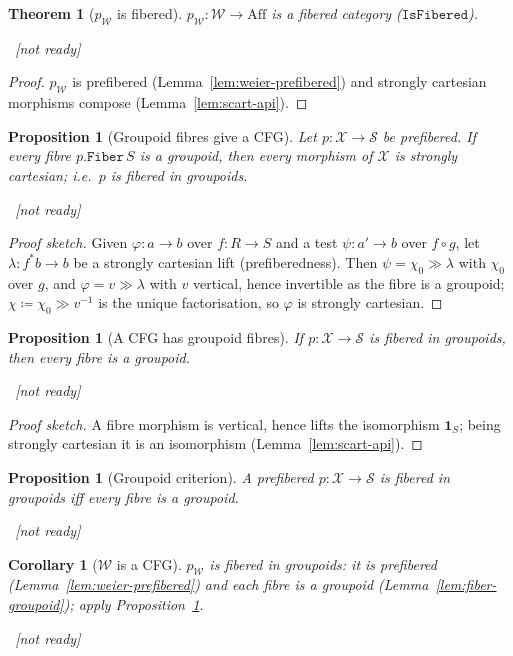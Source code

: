\documentclass[11pt]{article}
\newcommand{\lean}[1]{\par\smallskip\noindent{\footnotesize\texttt{Lean:\ #1}}\par}
\newcommand{\uses}[1]{}
\newcommand{\notready}{{\footnotesize\textcolor{red!60!black}{\ [not ready]}}}
\theoremstyle{definition}
\theoremstyle{plain}
\newtheorem{proposition}[definition]{Proposition}
\newtheorem{theorem}[definition]{Theorem}
\newtheorem{corollary}[definition]{Corollary}
\theoremstyle{remark}
\newcommand{\Aff}{\mathrm{Aff}}
\newcommand{\Weier}{\mathcal{W}}
\newcommand{\isFib}{\mathtt{IsFibered}}
\newcommand{\onel}{\mathbf 1}
\begin{document}
\begin{theorem}[$p_{\Weier}$ is fibered]\label{thm:weier-fibered}
$p_{\Weier}:\Weier\to\Aff$ is a fibered category ($\isFib$).
\lean{}\notready
\uses{def:isfibered,lem:weier-prefibered,lem:scart-api}
\end{theorem}
\begin{proof}
$p_{\Weier}$ is prefibered (Lemma~\ref{lem:weier-prefibered}) and strongly
cartesian morphisms compose (Lemma~\ref{lem:scart-api}).
\end{proof}

\begin{proposition}[Groupoid fibres give a CFG]\label{prop:cfg-suff}
Let $p:\mathcal X\to\mathcal S$ be prefibered.  If every fibre
$p.\mathtt{Fiber}\,S$ is a groupoid, then every morphism of $\mathcal X$ is
strongly cartesian; i.e.\ $p$ is fibered in groupoids.
\lean{}\notready
\uses{def:cfg,def:fiber,def:isfibered}
\end{proposition}
\begin{proof}[Proof sketch]
Given $\varphi:a\to b$ over $f:R\to S$ and a test $\psi:a'\to b$ over $f\circ g$,
let $\lambda:f^*b\to b$ be a strongly cartesian lift (prefiberedness).  Then
$\psi=\chi_0\gg\lambda$ with $\chi_0$ over $g$, and $\varphi=v\gg\lambda$ with $v$
vertical, hence invertible as the fibre is a groupoid; $\chi\coloneqq\chi_0\gg
v^{-1}$ is the unique factorisation, so $\varphi$ is strongly cartesian.
\end{proof}

\begin{proposition}[A CFG has groupoid fibres]\label{prop:cfg-nec}
If $p:\mathcal X\to\mathcal S$ is fibered in groupoids, then every fibre is a
groupoid.
\lean{}\notready
\uses{def:cfg,def:fiber,lem:scart-api}
\end{proposition}
\begin{proof}[Proof sketch]
A fibre morphism is vertical, hence lifts the isomorphism $\onel_S$; being
strongly cartesian it is an isomorphism (Lemma~\ref{lem:scart-api}).
\end{proof}

\begin{proposition}[Groupoid criterion]\label{prop:cfg-criterion}
A prefibered $p:\mathcal X\to\mathcal S$ is fibered in groupoids iff every fibre
is a groupoid.
\lean{}\notready
\uses{prop:cfg-suff,prop:cfg-nec}
\end{proposition}

\begin{corollary}[$\Weier$ is a CFG]\label{cor:weier-cfg}
$p_{\Weier}$ is fibered in groupoids: it is prefibered
(Lemma~\ref{lem:weier-prefibered}) and each fibre is a groupoid
(Lemma~\ref{lem:fiber-groupoid}); apply Proposition~\ref{prop:cfg-suff}.
\lean{}\notready
\uses{lem:weier-prefibered,lem:fiber-groupoid,prop:cfg-suff}
\end{corollary}
\end{document}
